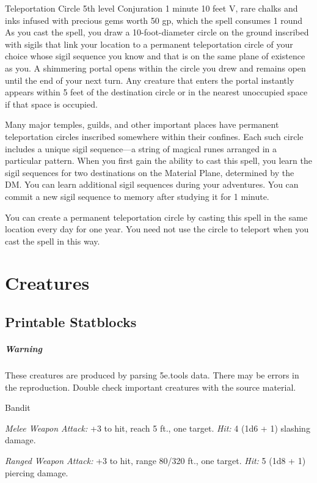 \documentclass[10pt,a4paper,twoside,bg=print,twocolumn,openany,nodeprecatedcode]{dndbook}
\begin{document}
\DndSpellHeader%
{Teleportation Circle}
{5th level Conjuration}
{1 minute}
{10 feet}
{V, rare chalks and inks infused with precious gems worth 50 gp, which the spell consumes}
{1 round}
As you cast the spell, you draw a 10-foot-diameter circle on the ground inscribed with sigils that link your location to a permanent teleportation circle of your choice whose sigil sequence you know and that is on the same plane of existence as you. A shimmering portal opens within the circle you drew and remains open until the end of your next turn. Any creature that enters the portal instantly appears within 5 feet of the destination circle or in the nearest unoccupied space if that space is occupied.

Many major temples, guilds, and other important places have permanent teleportation circles inscribed somewhere within their confines. Each such circle includes a unique sigil sequence—a string of magical runes arranged in a particular pattern. When you first gain the ability to cast this spell, you learn the sigil sequences for two destinations on the Material Plane, determined by the DM. You can learn additional sigil sequences during your adventures. You can commit a new sigil sequence to memory after studying it for 1 minute.

You can create a permanent teleportation circle by casting this spell in the same location every day for one year. You need not use the circle to teleport when you cast the spell in this way.

\chapter{Creatures}
\section{Printable Statblocks}
\paragraph{Warning} These creatures are produced by parsing 5e.tools data. There may be errors in the reproduction. Double check important creatures with the source material.\clearpage

\begin{DndMonster}[float=t]{Bandit}
\DndMonsterBasics[
armor-class = {12 (\textit{leather armor})},
hit-points = {\DndDice{2d8 + 2}},
speed = {30 ft.}
]
\DndMonsterAbilityScores[
 str = 11,
 dex = 12,
 con = 12,
 int = 10,
 wis = 10,
 cha = 10
]
\DndMonsterDetails[
languages = {any one language (usually Common)},
challenge = 1/8,
]
\par
{}
\textsl{Melee Weapon Attack:} +3 to hit, reach 5 ft., one target. \textsl{Hit:} 4 (1d6 + 1) slashing damage.

\textsl{Ranged Weapon Attack:} +3 to hit, range 80/320 ft., one target. \textsl{Hit:} 5 (1d8 + 1) piercing damage.

\end{DndMonster}
\end{document}

